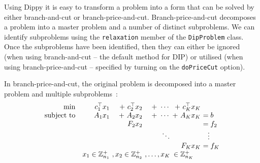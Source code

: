 Using Dippy it is easy to transform a problem into a form that can be solved by either branch-and-cut or branch-price-and-cut.
Branch-price-and-cut decomposes a problem into a master problem and a number of distinct subproblems.
We can identify subproblems using the \lstinline{relaxation} member of the \lstinline{DipProblem} class.
Once the subproblems have been identified, then they can either be ignored (when using branch-and-cut -- the default method for \ac{DIP}) or utilised (when using branch-price-and-cut -- specified by turning on the \lstinline{doPriceCut} option).

In branch-price-and-cut, the original problem is decomposed into a master problem and multiple subproblems~\cite{DWDecomp00}:
\begin{equation}
\begin{array}{rr@{\ }r@{\ }r@{\ }r@{\ }l}
             \min & c_1^\top x_1 & + \ c_2^\top x_2 & + \ \cdots & + \ c_K^\top x_K \\
\text{subject to} & A_1 x_1      & + \ A_2 x_2      & + \ \cdots & + \ A_K x_K      & = b \\
                  &              &   F_2 x_2      &          &                & = f_2 \\
                  &              &                &  \ddots  &                & \ \ \vdots \\
                  &              &                &          &   F_K x_K      & = f_K \\
                  & x_1 \in \mathbb{Z}^{+}_{n_1} &, x_2 \in \mathbb{Z}^{+}_{n_2}&, \ldots, x_K & \in \mathbb{Z}^{+}_{n_K} \quad
\end{array}
\label{eqn:decomp}
\end{equation}

